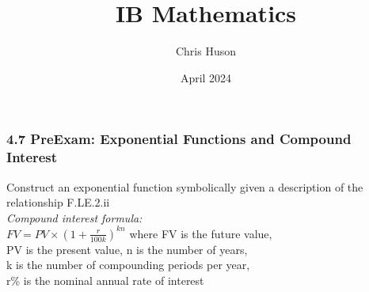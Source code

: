 \documentclass[12pt, twoside]{article}
\title{IB Mathematics}
\author{Chris Huson}
\date{April 2024} %
\begin{document}
\subsubsection*{4.7 PreExam: Exponential Functions and Compound Interest}
Construct an exponential function symbolically given a description of the relationship \hfill F.LE.2.ii \\[0.5cm]
\emph{Compound interest formula:} \\
$\displaystyle FV=PV \times \left(1+\frac{r}{100k} \right)^{kn}$
where FV is the future value,\\[0.25cm]
PV is the present value, n is the number of years, \\
 k is the number of compounding periods per year, \\
 r\% is the nominal annual rate of interest
\end{document}
